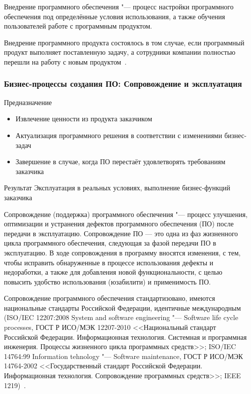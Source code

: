 \documentclass{../industrial-development}
\begin{document}
\lecturenotes
	
Внедрение программного обеспечения "--- процесс настройки программного обеспечения под определённые условия использования, а также обучения пользователей работе с программным продуктом.

Внедрение программного продукта состоялось в том случае, если программный продукт выполняет поставленную задачу, а сотрудники компании полностью перешли на работу с новым продуктом~\cite{Habr3}.	


\begin{frame} \frametitle{Бизнес-процессы создания ПО: Сопровождение и эксплуатация}
	\begin{block}{Предназначение}
		\begin{itemize}
			\item Извлечение ценности из продукта заказчиком
			\item Актуализация программного решения в соответствии с изменениями бизнес-задач
			\item Завершение в случае, когда ПО перестаёт удовлетворять требованиям заказчика
		\end{itemize}
	\end{block}
	\begin{block}{Результат}
		Эксплуатация в реальных условиях, выполнение бизнес-функций заказчика
	\end{block}
\end{frame}

\lecturenotes

Сопровождение (поддержка) программного обеспечения "--- процесс улучшения, оптимизации и устранения дефектов программного обеспечения (ПО) после передачи в эксплуатацию. Сопровождение ПО — это одна из фаз жизненного цикла программного обеспечения, следующая за фазой передачи ПО в эксплуатацию. В ходе сопровождения в программу вносятся изменения, с тем, чтобы исправить обнаруженные в процессе использования дефекты и недоработки, а также для добавления новой функциональности, с целью повысить удобство использования (юзабилити) и применимость ПО.

Сопровождение программного обеспечения стандартизовано, имеются национальные стандарты Российской Федерации, идентичные международным (ISO/IEC 12207:2008 System and software engineering "--- Software life cycle processes, ГОСТ Р ИСО/МЭК 12207-2010 <<Национальный стандарт Российской Федерации. Информационная технология. Системная и программная инженерия. Процессы жизненного цикла программных средств>>; ISO/IEC 14764:99 Information tehnology "--- Software maintenance, ГОСТ Р ИСО/МЭК 14764-2002 <<Государственный стандарт Российской Федерации. Информационная технология. Сопровождение программных средств>>; IEEE 1219)~\cite{Wiki1}.
\end{document}

